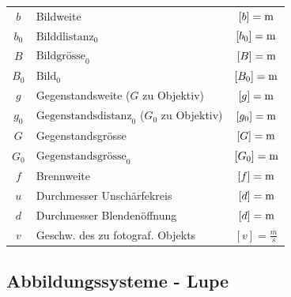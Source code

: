 \begin{tabular}{c l c}
	$b$ & Bildweite & $[b] = \mathrm{m}$ \\
	$b_0$ & $\text{Bilddlistanz}_0$ & $[b_0] = \mathrm{m}$ \\
	$B$ & $\text{Bildgrösse}_0$ & $[B] = \mathrm{m}$ \\
	$B_0$ & $\text{Bild}_0$ & $[B_0] = \mathrm{m}$ \\
	$g$ & Gegenstandsweite ($G$ zu Objektiv) & $[g] = \mathrm{m}$ \\
	$g_0$ & $\text{Gegenstandsdistanz}_0$ ($G_0$ zu Objektiv) & $[g_0] = \mathrm{m}$ \\
	$G$ & Gegenstandsgrösse & $[G] = \mathrm{m}$ \\
	$G_0$ & $\text{Gegenstandsgrösse}_0$ & $[G_0] = \mathrm{m}$ \\
	$f$ & Brennweite & $[f] = \mathrm{m}$ \\
	$u$ & Durchmesser Unschärfekreis & $[d] = \mathrm{m}$ \\
	$d$ & Durchmesser Blendenöffnung & $[d] = \mathrm{m}$ \\
	$v$ & Geschw. des zu fotograf. Objekts & $[v] = \frac{m}{s}$
\end{tabular}






\subsection{Abbildungssysteme - Lupe}


